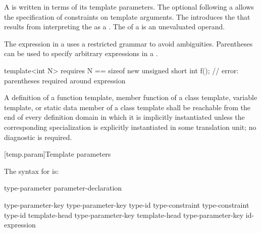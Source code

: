 \pnum
A  is written
in terms of its template parameters.
The optional  following a
 allows the specification of
constraints on template arguments.
The  introduces the
 that results from interpreting
the  as a
.
The  of a
 is an unevaluated operand.
\begin{note}
The expression in a 
uses a restricted grammar to avoid ambiguities.
Parentheses can be used to specify arbitrary expressions
in a .
\begin{example}
\begin{codeblock}
template<int N> requires N == sizeof new unsigned short
int f();            // error: parentheses required around \tcode{==} expression
\end{codeblock}
\end{example}
\end{note}

\pnum
A definition of
a function template,
member function of a class template,
variable template,
or static data member of a class template
shall be reachable from the end of every definition domain
in which it is implicitly instantiated unless the
corresponding specialization is explicitly instantiated
in some translation unit; no diagnostic is required.

[temp.param]{Template parameters}

\pnum
The syntax for
is:
\begin{bnf}
\br
  type-parameter\br
  parameter-declaration
\end{bnf}

\begin{bnf}
\br
  type-parameter-key  \br
  type-parameter-key  \terminal{=} type-id\br
  type-constraint  \br
  type-constraint  \terminal{=} type-id\br
  template-head type-parameter-key  \br
  template-head type-parameter-key  \terminal{=} id-expression
\end{bnf}

